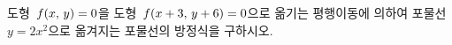 도형~$f(x,\mkern3mu y)=0$을 도형~$f(x+3,\mkern3mu y+6)=0$으로 옮기는 평행이동에 의하여 포물선~$y=2x^2$으로 옮겨지는 포물선의 방정식을 구하시오.
